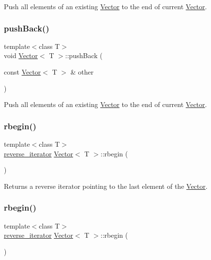 Push all elements of an existing \hyperlink{classVector}{Vector} to the end of current \hyperlink{classVector}{Vector}. \mbox{\label{classVector_abf8b935246cbe7710aabf8e1f3e63952}} 
\subsubsection{\texorpdfstring{push\+Back()}{pushBack()}\hspace{0.1cm}{\footnotesize\ttfamily [4/4]}}
{\footnotesize\ttfamily template$<$class T$>$ \\
void \hyperlink{classVector}{Vector}$<$ T $>$\+::push\+Back (\begin{DoxyParamCaption}\item[{const \hyperlink{classVector}{Vector}$<$ T $>$ \&}]{other }\end{DoxyParamCaption})\hspace{0.3cm}{\ttfamily [inline]}}

Push all elements of an existing \hyperlink{classVector}{Vector} to the end of current \hyperlink{classVector}{Vector}. \mbox{\label{classVector_a72d1ce8358a966c55da760012fb9a68b}} 
\subsubsection{\texorpdfstring{rbegin()}{rbegin()}\hspace{0.1cm}{\footnotesize\ttfamily [1/4]}}
{\footnotesize\ttfamily template$<$class T$>$ \\
\hyperlink{classVector_a6afe8339bd8b2187c173c0f46bbd7d63}{reverse\+\_\+iterator} \hyperlink{classVector}{Vector}$<$ T $>$\+::rbegin (\begin{DoxyParamCaption}{ }\end{DoxyParamCaption})\hspace{0.3cm}{\ttfamily [inline]}}

Returns a reverse iterator pointing to the last element of the \hyperlink{classVector}{Vector}. \mbox{\label{classVector_a72d1ce8358a966c55da760012fb9a68b}} 
\subsubsection{\texorpdfstring{rbegin()}{rbegin()}\hspace{0.1cm}{\footnotesize\ttfamily [2/4]}}
{\footnotesize\ttfamily template$<$class T$>$ \\
\hyperlink{classVector_a6afe8339bd8b2187c173c0f46bbd7d63}{reverse\+\_\+iterator} \hyperlink{classVector}{Vector}$<$ T $>$\+::rbegin (\begin{DoxyParamCaption}{ }\end{DoxyParamCaption})\hspace{0.3cm}{\ttfamily [inline]}}


